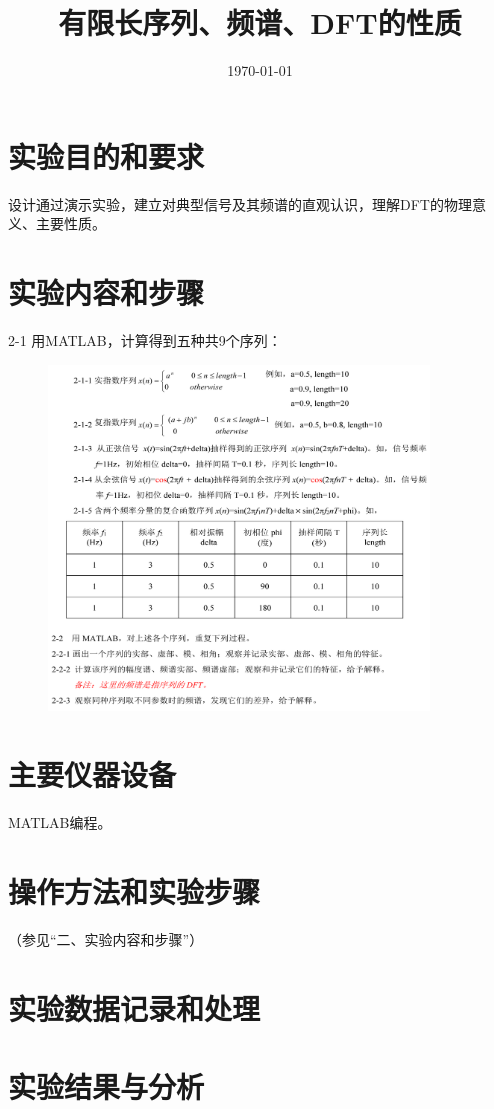 \documentclass{../source/Experiment}
\title{有限长序列、频谱、DFT的性质}
\date{\today}
\begin{document}
    \makeheader
    \section{实验目的和要求}
    设计通过演示实验，建立对典型信号及其频谱的直观认识，理解DFT的物理意义、主要性质。

    \section{实验内容和步骤}
    2-1 用MATLAB，计算得到五种共9个序列：
    \begin{figure}[H]
        \centering
        \includegraphics[width = 0.90\textwidth]{pic/2.png}
    \end{figure}
    \newpage

    \section{主要仪器设备}
    
    MATLAB编程。

    \section{操作方法和实验步骤}

    （参见“二、实验内容和步骤”）

    \section{实验数据记录和处理}

    \section{实验结果与分析}
\end{document}
